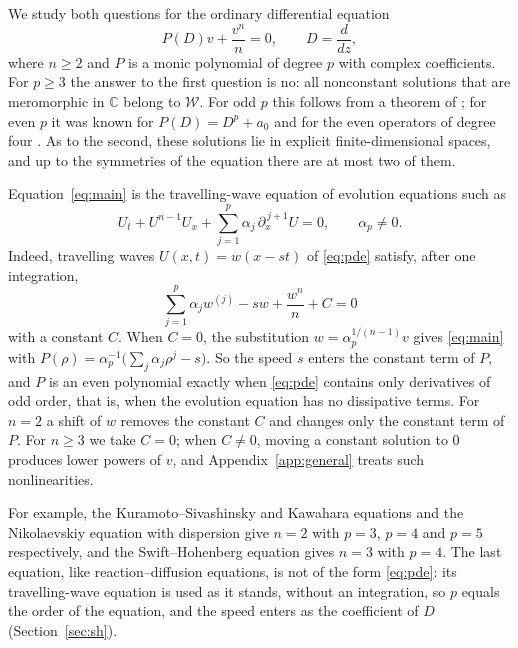 \documentclass[11pt]{article}
\theoremstyle{definition}
\theoremstyle{remark}
\numberwithin{equation}{section}
\newcommand{\CC}{\mathbb C}
\newcommand{\Wclass}{\mathcal W}
\begin{document}
We study both questions for the ordinary differential equation
\begin{equation}\label{eq:main}
 P(D)v+\frac{v^n}{n}=0,\qquad D=\frac{d}{dz},
\end{equation}
where \(n\ge2\) and \(P\) is a monic polynomial of degree \(p\) with
complex coefficients. For \(p\ge3\) the answer to the first question is
no: all nonconstant solutions that are meromorphic in \(\CC\) belong to
\(\Wclass\). For odd \(p\) this follows from a theorem of
\citet[Theorem~2]{Eremenko2006}; for even \(p\) it was known for
\(P(D)=D^p+a_0\) \citep{EremenkoLiaoNg2009} and for the even operators
of degree four \citep{DeminaKudryashovKawahara2010,ConteNgWong2012}.
As to the second, these solutions lie in explicit
finite-dimensional spaces, and up to the symmetries of the equation
there are at most two of them.

Equation~\eqref{eq:main} is the travelling-wave equation of evolution
equations such as
\begin{equation}\label{eq:pde}
 U_t+U^{n-1}U_x+\sum_{j=1}^{p}\alpha_j\,\partial_x^{\,j+1}U=0,
 \qquad \alpha_p\ne0.
\end{equation}
Indeed, travelling waves \(U(x,t)=w(x-st)\) of \eqref{eq:pde} satisfy,
after one integration,
\[
 \sum_{j=1}^{p}\alpha_jw^{(j)}-sw+\frac{w^n}{n}+C=0
\]
with a constant \(C\). When \(C=0\), the substitution
\(w=\alpha_p^{1/(n-1)}v\) gives \eqref{eq:main} with
\(P(\rho)=\alpha_p^{-1}\bigl(\sum_j\alpha_j\rho^j-s\bigr)\). So the
speed \(s\) enters the constant term of \(P\), and \(P\) is an even
polynomial exactly when \eqref{eq:pde} contains only derivatives of odd
order, that is, when the evolution equation has no dissipative terms.
For \(n=2\) a shift of \(w\) removes the constant \(C\) and changes
only the constant term of \(P\). For \(n\ge3\) we take \(C=0\); when
\(C\ne0\), moving a constant solution to \(0\) produces lower powers of
\(v\), and Appendix~\ref{app:general} treats such nonlinearities.

For example, the Kuramoto--Sivashinsky
\citep{KuramotoTsuzuki1976,Sivashinsky1977} and Kawahara
\citep{Kawahara1972} equations and the Nikolaevskiy equation with
dispersion \citep{KudryashovMigita2007} give \(n=2\) with \(p=3\),
\(p=4\) and \(p=5\) respectively, and the Swift--Hohenberg equation
\citep{SwiftHohenberg1977} gives \(n=3\) with \(p=4\). The last
equation, like reaction--diffusion equations, is not of the form
\eqref{eq:pde}: its travelling-wave equation is used as it stands,
without an integration, so \(p\) equals the order of the equation, and the speed enters as the
coefficient of \(D\) (Section~\ref{sec:sh}).
\end{document}
